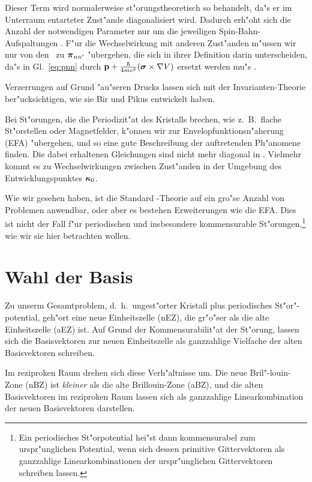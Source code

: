 Dieser Term wird normalerweise st"orungstheoretisch so behandelt, da"s er im
Unterraum entarteter Zust"ande diagonalisiert wird. Dadurch erh"oht sich die
Anzahl der notwendigen Parameter nur um die jeweiligen Spin-Bahn-Aufspaltungen
\cite{kane:66}. F"ur die Wechselwirkung mit anderen Zust"anden m"ussen
wir nur von den \pnn\ zu $\grvec{\pi}_{\mathnormal{n\pri{n}}}$
"ubergehen, die sich in ihrer Definition darin unterscheiden, da"s in
Gl.~\eqref{eq:pnn}  durch $\vecop{p} +
\frac{\hbar}{4mc^{2}} (\grvecop{\sigma} \times \nabla\op{V})$ ersetzt
werden mu"s \cite{luko:55}. 

Verzerrungen auf Grund "au"seren Drucks lassen sich mit der
Invarianten-Theorie ber"ucksichtigen, wie sie Bir und Pikus \cite{bipi:74}
entwickelt haben. 

Bei St"orungen, die die Periodizit"at des Kristalls brechen, wie z.~B.\ flache
St"orstellen oder Magnetfelder, k"onnen wir zur Envelopfunktionsn"aherung
(EFA) \cite{luko:55} "ubergehen, und so eine gute Beschreibung der
auftretenden Ph"anomene finden. Die dabei erhaltenen Gleichungen sind nicht
mehr diagonal in \ak. Vielmehr kommt es zu Wechselwirkungen zwischen
Zust"anden in der Umgebung des Entwicklungspunktes $\ak_{0}$.

Wie wir gesehen haben, ist die Standard \kdotp-Theorie auf ein gro"se Anzahl
von Problemen anwendbar, oder aber es bestehen Erweiterungen wie die EFA. Dies
ist nicht der Fall f"ur periodischen und insbesondere kommensurable
St"orungen,\footnote{Ein periodisches St"orpotential hei"st dann kommensurabel
  zum urspr"unglichen Potential, wenn sich dessen primitive Gittervektoren als
  ganzzahlige Linearkombinationen der urspr"unglichen Gittervektoren schreiben
  lassen.}
wie wir sie hier betrachten wollen. 

\section{Wahl der Basis}
\label{sec:basis}

Zu unserm Gesamtproblem, d.~h.\ ungest"orter Kristall plus periodisches
St"or"-potential, geh"ort eine neue Einheitszelle (nEZ), die gr"o"ser als die 
alte Einheitszelle (aEZ) ist. Auf Grund der Kommensurabilit"at der St"orung,
lassen sich die Basisvektoren zur neuen Einheitszelle als ganzzahlige
Vielfache der alten Basisvektoren schreiben.

Im reziproken Raum drehen sich diese Verh"altnisse um. Die neue
Bril"-louin-Zone (nBZ) ist \emph{kleiner} als die alte Brillouin-Zone (aBZ),
und die alten Basisvektoren im reziproken Raum lassen sich als ganzzahlige
Linearkombination der neuen Basisvektoren darstellen.

